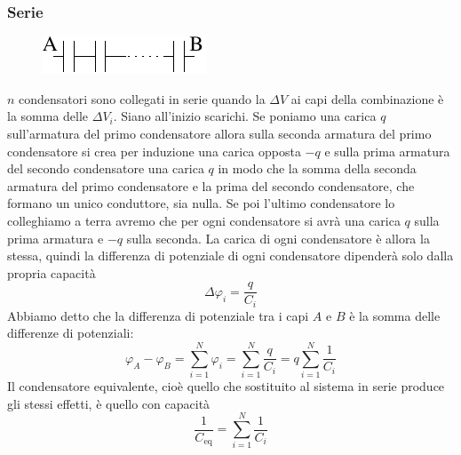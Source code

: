 \subsubsection{Serie}
\begin{figure}[htbp]
\centering
\includegraphics[scale=1.2]{immagini/fisica2/cond2}
\end{figure}
$n$ condensatori sono collegati in serie quando la $\Delta V$ ai capi della combinazione è la somma delle $\Delta V_i$. Siano all'inizio scarichi. Se poniamo una carica $q$ sull'armatura del primo condensatore allora sulla seconda armatura del primo condensatore si crea per induzione una carica opposta $-q$ e sulla prima armatura del secondo condensatore una carica $q$ in modo che la somma della seconda armatura del primo condensatore e la prima del secondo condensatore, che formano un unico conduttore, sia nulla. Se poi l'ultimo condensatore lo colleghiamo a terra avremo che per ogni condensatore si avrà una carica $q$ sulla prima armatura e $-q$ sulla seconda. La carica di ogni condensatore è allora la stessa, quindi la differenza di potenziale di ogni condensatore dipenderà solo dalla propria capacità 
\begin{equation*}\Delta\varphi_i=\frac{q}{C_i}\end{equation*}
Abbiamo detto che la differenza di potenziale tra i capi $A$ e $B$ è la somma delle differenze di potenziali:
\begin{equation*}\varphi_A-\varphi_B=\sum_{i=1}^N\varphi_i=\sum_{i=1}^N\frac{q}{C_i}=q\sum_{i=1}^N\frac{1}{C_i}\end{equation*}
Il condensatore equivalente, cioè quello che sostituito al sistema in serie produce gli stessi effetti, è quello con capacità 
\begin{equation*}\frac{1}{C_\text{eq}}=\sum_{i=1}^N\frac{1}{C_i}\end{equation*}
